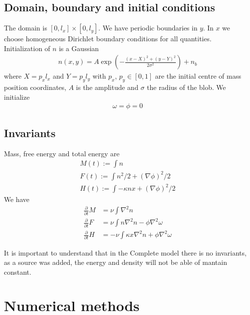 \documentclass{hitec} %
\begin{document}
\subsection{Domain, boundary and initial conditions}
The domain is $[0,l_x]\times[0,l_y]$.
We have periodic boundaries in $y$. In $x$ we choose homogeneous Dirichlet boundary conditions for all quantities.
Initialization of $n$ is a Gaussian
\begin{align}
    n(x,y) = A\exp\left( -\frac{(x-X)^2 + (y-Y)^2}{2\sigma^2}\right) + n_b
    \label{}
\end{align}
where $X = p_x l_x$ and $Y=p_yl_y$ with $p_x$, $p_y\in [0,1]$ are the initial centre of mass position coordinates, $A$ is the amplitude and $\sigma$ the
radius of the blob.
We initialize
\begin{align}
    \omega = \phi = 0
    \label{}
\end{align}
\subsection{Invariants}
Mass, free energy and total energy are
\begin{align*}
    M(t) := \int n \\
    F(t) := \int n^2/2 + (\nabla\phi)^2/2 \\
    H(t) := \int -\kappa nx + (\nabla\phi)^2/2
    \label{}
\end{align*}
We have
\begin{align}
  \frac{\partial}{\partial t} M &= \nu \int \nabla^2 n \\
  \frac{\partial}{\partial t} F &= \nu\int n\nabla^2 n - \phi\nabla^2\omega \\
  \frac{\partial}{\partial t} H &= - \nu \int \kappa x \nabla^2 n + \phi\nabla^2\omega
  \label{}
\end{align}

It is important to understand that in the Complete model there is no invariants, as a source was added, the energy and density will not be able of mantain constant.

\section{Numerical methods}
\end{document}
